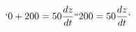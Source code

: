 \documentclass[preview]{standalone}
\begin{document}
\begin{align*}
`0 + 200 = 50 \frac{dz}{dt}`
`200 = 50 \frac{dz}{dt}`
\end{align*}
\end{document}
